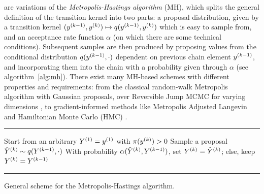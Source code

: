  are variations of the \emph{Metropolis-Hastings algorithm}
(MH), which splits the general definition of the transition kernel into two parts: a proposal
distribution, given by a transition kernel
\((\kth[k-1]{y}, \kth{y}) \mapsto q(\kth[k-1]{y}, \kth{y})\) which is easy to sample from, and an
acceptance rate function \(\alpha\) (on which there are some technical conditions).  Subsequent
samples are then produced by proposing values from the conditional distribution
\(q(\kth[k-1]{y}, \cdot)\) dependent on previous chain element \(\kth[k-1]{y}\), and incorporating
them into the chain with a probability given through \(\alpha\) (see algorithm~\ref{alg:mh}).  There
exist many MH-based schemes with different properties and requirements: from the classical
random-walk Metropolis algorithm with Gaussian proposals, over Reversible Jump MCMC for varying
dimensions \parencite{green1995reversible}, to gradient-informed methods like Metropolis Adjusted
Langevin and Hamiltonian Monte Carlo (HMC) \parencite{betancourt2018conceptual,girolami2011riemann}.


\begin{algorithm}[t]
  \hrule
  \begin{algorithmic}
    \State Start from an arbitrary \(\kth[1]{Y} = \kth[1]{y}\) with \(\pi(\kth{y}) > 0\)
    \State Sample a proposal \(\kth[k]{\hat{Y}} \from q(\kth[k-1]{Y}, \cdot)\)
    \State With probability \(\alpha(\kth[k]{\hat{Y}}, \kth[k-1]{Y})\), set
    \(\kth[k]{Y} = \kth[k]{\hat{Y}}\); else, keep \(\kth[k]{Y} = \kth[k-1]{Y}\)
    \EndFor
  \end{algorithmic}
  \hrule
  \caption{General scheme for the Metropolis-Hastings algorithm.\label{alg:mh}}
\end{algorithm}

